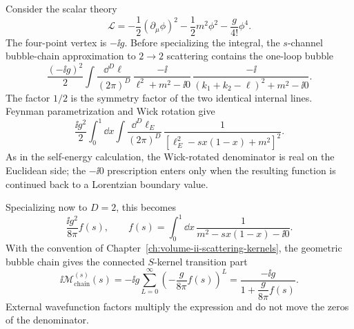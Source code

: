 Consider the scalar theory
\[
  \mathcal L
  =
  -\frac12(\partial_\mu\phi)^2
  -\frac12m^2\phi^2
  -\frac{g}{4!}\phi^4 .
\]
The four-point vertex is \(-\ii g\).  Before specializing the integral, the
\(s\)-channel bubble-chain approximation to \(2\to2\) scattering contains the
one-loop bubble
\[
  \frac{(-\ii g)^2}{2}
  \int\frac{\dd^D\ell}{(2\pi)^D}\,
  \frac{-\ii}{\ell^2+m^2-\ii0}\,
  \frac{-\ii}{(k_1+k_2-\ell)^2+m^2-\ii0}.
\]
The factor \(1/2\) is the symmetry factor of the two identical internal
lines.  Feynman parametrization and Wick rotation give
\[
  \frac{\ii g^2}{2}
  \int_0^1\dd x
  \int\frac{\dd^D\ell_E}{(2\pi)^D}\,
  \frac{1}{\left[\ell_E^2-sx(1-x)+m^2\right]^2}.
\]
As in the self-energy calculation, the Wick-rotated denominator is real on the
Euclidean side; the \(-\ii0\) prescription enters only when the resulting
function is continued back to a Lorentzian boundary value.

Specializing now to \(D=2\), this becomes
\[
  \frac{\ii g^2}{8\pi} f(s),
  \qquad
  f(s)=
  \int_0^1\dd x\,
  \frac{1}{m^2-sx(1-x)-\ii0}.
\]
With the convention of
Chapter~\ref{ch:volume-ii-scattering-kernels}, the geometric bubble chain gives
the connected \(S\)-kernel transition part
\[
  \ii\mathcal M_{\mathrm{chain}}^{(s)}(s)
  =
  -\ii g
  \sum_{L=0}^{\infty}
  \left(-\frac{g}{8\pi}f(s)\right)^L
  =
  \frac{-\ii g}{1+\dfrac{g}{8\pi}f(s)} .
\]
External wavefunction factors multiply the expression and do not move the
zeros of the denominator.

